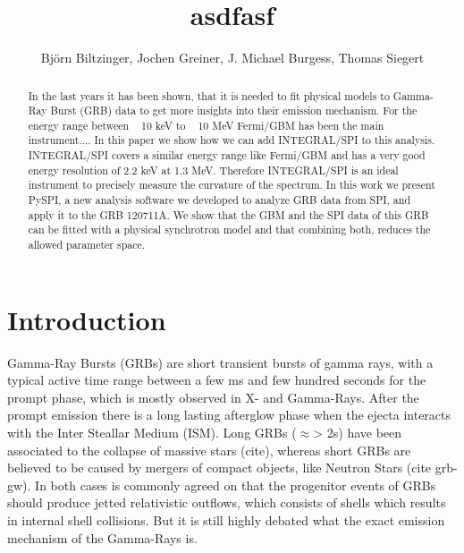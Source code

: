 \documentclass[modern]{aastex631}
\begin{document}
\title{asdfasf}

\author{Björn Biltzinger, Jochen Greiner, J. Michael Burgess, Thomas Siegert}

\begin{abstract}
  In the last years it has been shown, that it is needed to fit physical models to Gamma-Ray Burst (GRB) data to get more insights into their emission mechanism. For the energy range between ~ 10 keV to ~ 10 MeV Fermi/GBM has been the main instrument.... In this paper we show how we can add INTEGRAL/SPI to this analysis. INTEGRAL/SPI covers a similar energy range like Fermi/GBM and has a very good energy resolution of 2.2 keV at 1.3 MeV. Therefore INTEGRAL/SPI is an ideal instrument to precisely measure the curvature of the spectrum. In this work we present PySPI, a new analysis software we developed to analyze GRB data from SPI, and apply it to the GRB 120711A. We show that the GBM and the SPI data of this GRB can be fitted with a physical synchrotron model and that combining both, reduces the allowed parameter space.

\end{abstract}

\section{Introduction}
Gamma-Ray Bursts (GRBs) are short transient bursts of gamma rays, with a typical active time range between a few ms and few hundred seconds for the prompt phase, which is mostly observed in X- and Gamma-Rays. After the prompt emission there is a long lasting afterglow phase when the ejecta interacts with the Inter Steallar Medium (ISM). Long GRBs ($\approx$> 2s) have been associated to the collapse of massive stars (cite), whereas short GRBs are believed to be caused by mergers of compact objects, like Neutron Stars (cite grb-gw). In both cases is commonly agreed on that the progenitor events of GRBs should produce jetted relativistic outflows, which consists of shells which results in internal shell collisions. But it is still highly debated what the exact emission mechanism of the Gamma-Rays is.
\end{document}
